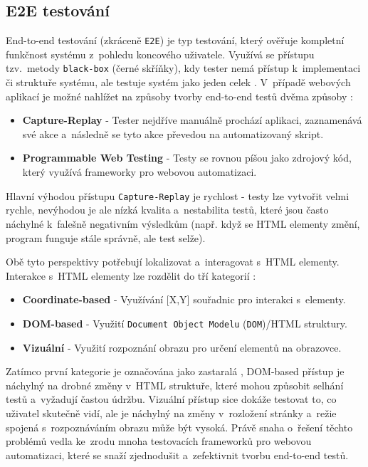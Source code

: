 \documentclass[czech, ing, kiv, he, iso690numb, viewonly]{fasthesis}
\begin{document}
\subsection{E2E testování}

End-to-end testování (zkráceně \texttt{E2E}) je typ testování, který ověřuje kompletní funkčnost systému z~pohledu koncového uživatele. 
Využívá se přístupu tzv.~metody \texttt{black-box} (černé skříňky), kdy tester nemá přístup k~implementaci či struktuře systému, 
ale testuje systém jako jeden celek \cite{herout_testovani_programatory, leotta2016approaches}. V~případě webových aplikací je možné nahlížet  
na způsoby tvorby end-to-end testů dvěma způsoby \cite{leotta2016approaches}:

\begin{itemize}
    \item \textbf{Capture-Replay} - Tester nejdříve manuálně prochází aplikaci, zaznamenává své akce a~následně se tyto akce převedou na automatizovaný skript.
    \item \textbf{Programmable Web Testing} - Testy se rovnou píšou jako zdrojový kód, který využívá frameworky pro webovou automatizaci.
\end{itemize}

Hlavní výhodou přístupu \texttt{Capture-Replay} je rychlost - testy lze vytvořit velmi rychle, nevýhodou je ale nízká kvalita a~nestabilita testů, které jsou často náchylné 
k~falešně negativním výsledkům (např. když se HTML elementy změní, program funguje stále správně, ale test selže).

Obě tyto perspektivy potřebují lokalizovat a~interagovat s~HTML elementy. Interakce s~HTML elementy lze rozdělit do tří kategorií \cite{leotta2016approaches}:

\begin{itemize}
    \item \textbf{Coordinate-based} - Využívání [X,Y] souřadnic pro interakci s~elementy.
    \item \textbf{DOM-based} - Využití \texttt{Document Object Modelu} (\texttt{DOM})/HTML struktury.
    \item \textbf{Vizuální} - Využití rozpoznání obrazu pro určení elementů na obrazovce.
\end{itemize}

Zatímco první kategorie je označována jako zastaralá \cite{leotta2016approaches}, DOM-based přístup je náchylný na drobné změny v~HTML struktuře, 
které mohou způsobit selhání testů a~vyžadují častou údržbu. Vizuální přístup sice dokáže testovat to, co uživatel skutečně vidí, 
ale je náchylný na změny v~rozložení stránky a~režie spojená s~rozpoznáváním obrazu může být vysoká. Právě snaha o~řešení těchto problémů 
vedla ke~zrodu mnoha testovacích frameworků pro webovou automatizaci, které se snaží zjednodušit a~zefektivnit tvorbu end-to-end testů.
\end{document}

